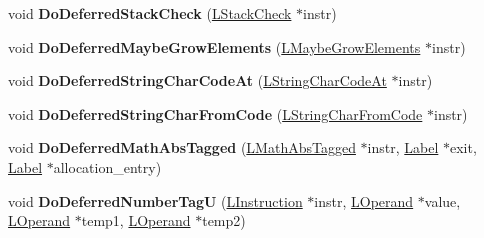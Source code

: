 \begin{DoxyCompactItemize}
\item 
void {\bfseries Do\+Deferred\+Stack\+Check} (\hyperlink{classv8_1_1internal_1_1_l_stack_check}{L\+Stack\+Check} $\ast$instr)\hypertarget{classv8_1_1internal_1_1_l_code_gen_a273730f2504ea249d9deb8dde7b314ee}{}\label{classv8_1_1internal_1_1_l_code_gen_a273730f2504ea249d9deb8dde7b314ee}

\item 
void {\bfseries Do\+Deferred\+Maybe\+Grow\+Elements} (\hyperlink{classv8_1_1internal_1_1_l_maybe_grow_elements}{L\+Maybe\+Grow\+Elements} $\ast$instr)\hypertarget{classv8_1_1internal_1_1_l_code_gen_afe319c35fc8adaff35f3417fb7c833d6}{}\label{classv8_1_1internal_1_1_l_code_gen_afe319c35fc8adaff35f3417fb7c833d6}

\item 
void {\bfseries Do\+Deferred\+String\+Char\+Code\+At} (\hyperlink{classv8_1_1internal_1_1_l_string_char_code_at}{L\+String\+Char\+Code\+At} $\ast$instr)\hypertarget{classv8_1_1internal_1_1_l_code_gen_a6b229168338a73ef11c203f845b68cb4}{}\label{classv8_1_1internal_1_1_l_code_gen_a6b229168338a73ef11c203f845b68cb4}

\item 
void {\bfseries Do\+Deferred\+String\+Char\+From\+Code} (\hyperlink{classv8_1_1internal_1_1_l_string_char_from_code}{L\+String\+Char\+From\+Code} $\ast$instr)\hypertarget{classv8_1_1internal_1_1_l_code_gen_acf78c92290237e368a4b178f049afbc6}{}\label{classv8_1_1internal_1_1_l_code_gen_acf78c92290237e368a4b178f049afbc6}

\item 
void {\bfseries Do\+Deferred\+Math\+Abs\+Tagged} (\hyperlink{classv8_1_1internal_1_1_l_math_abs_tagged}{L\+Math\+Abs\+Tagged} $\ast$instr, \hyperlink{classv8_1_1internal_1_1_label}{Label} $\ast$exit, \hyperlink{classv8_1_1internal_1_1_label}{Label} $\ast$allocation\+\_\+entry)\hypertarget{classv8_1_1internal_1_1_l_code_gen_aa87b1d7e49716b981f1cac52b1e5f49e}{}\label{classv8_1_1internal_1_1_l_code_gen_aa87b1d7e49716b981f1cac52b1e5f49e}

\item 
void {\bfseries Do\+Deferred\+Number\+TagU} (\hyperlink{classv8_1_1internal_1_1_l_instruction}{L\+Instruction} $\ast$instr, \hyperlink{classv8_1_1internal_1_1_l_operand}{L\+Operand} $\ast$value, \hyperlink{classv8_1_1internal_1_1_l_operand}{L\+Operand} $\ast$temp1, \hyperlink{classv8_1_1internal_1_1_l_operand}{L\+Operand} $\ast$temp2)\hypertarget{classv8_1_1internal_1_1_l_code_gen_a91c94df4d0a873f42d072c189b8db563}{}\label{classv8_1_1internal_1_1_l_code_gen_a91c94df4d0a873f42d072c189b8db563}


\end{DoxyCompactItemize}
